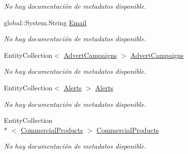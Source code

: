 \begin{DoxyCompactItemize}
\begin{DoxyCompactList}\small\item\em No hay documentación de metadatos disponible. \end{DoxyCompactList}\item 
global\-::\-System.\-String \hyperlink{class_microsoft_1_1_samples_1_1_kinect_1_1_basic_interactions_1_1_customers_a56255c40b2f61130aa26beab94237aa3}{Email}
\begin{DoxyCompactList}\small\item\em No hay documentación de metadatos disponible. \end{DoxyCompactList}\item 
Entity\-Collection$<$ \hyperlink{class_microsoft_1_1_samples_1_1_kinect_1_1_basic_interactions_1_1_advert_campaigns}{Advert\-Campaigns} $>$ \hyperlink{class_microsoft_1_1_samples_1_1_kinect_1_1_basic_interactions_1_1_customers_a789d26281780016a8f25d184f53c8de4}{Advert\-Campaigns}
\begin{DoxyCompactList}\small\item\em No hay documentación de metadatos disponible. \end{DoxyCompactList}\item 
Entity\-Collection$<$ \hyperlink{class_microsoft_1_1_samples_1_1_kinect_1_1_basic_interactions_1_1_alerts}{Alerts} $>$ \hyperlink{class_microsoft_1_1_samples_1_1_kinect_1_1_basic_interactions_1_1_customers_a8070a2e1f0901b58f2cd6bb4fb8de838}{Alerts}
\begin{DoxyCompactList}\small\item\em No hay documentación de metadatos disponible. \end{DoxyCompactList}\item 
Entity\-Collection\\*
$<$ \hyperlink{class_microsoft_1_1_samples_1_1_kinect_1_1_basic_interactions_1_1_commercial_products}{Commercial\-Products} $>$ \hyperlink{class_microsoft_1_1_samples_1_1_kinect_1_1_basic_interactions_1_1_customers_a060cdcb922b96692f13bb172da63d40e}{Commercial\-Products}
\begin{DoxyCompactList}\small\item\em No hay documentación de metadatos disponible. \end{DoxyCompactList}\item 

\end{DoxyCompactItemize}
